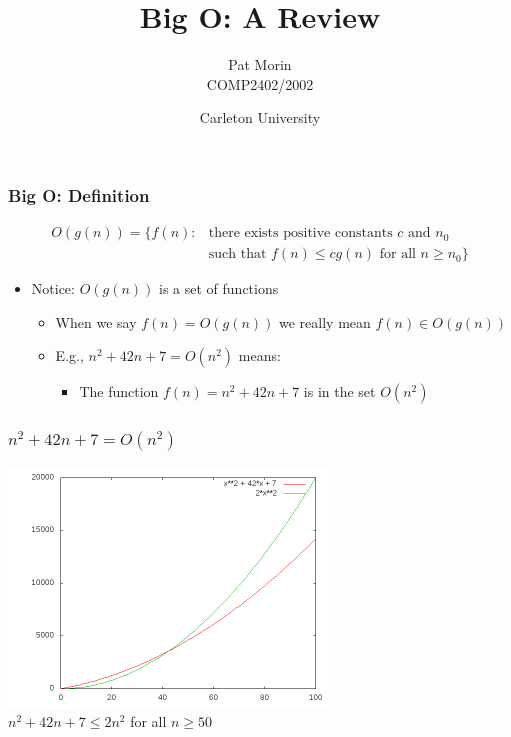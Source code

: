 \documentclass[xcolor=dvipsnames]{beamer}
\title{Big O: A Review}
\author{Pat Morin \\ COMP2402/2002}
\date{Carleton University}
\begin{document}
\begin{frame}
  \titlepage
\end{frame}

\begin{frame}
  \frametitle{Big O: Definition} 
   \[ \begin{array}{ll} O(g(n)) = \{ f(n) : &
          \mbox{there exists positive constants $c$ and $n_0$} \\
          & \mbox{such that $f(n) \le cg(n)$ for all $n\ge n_0$} \}\end{array} 
   \]
  \begin{itemize}
  \item<2-> Notice: $O(g(n))$ is a set of functions
   \begin{itemize}
     \item<3-> When we say $f(n)=O(g(n))$ we really mean $f(n)\in O(g(n))$
     \item<4-> E.g., $n^2 + 42n + 7 = O(n^2)$ means:
     \begin{itemize}
       \item<4-> The function $f(n)=n^2 + 42n + 7$ is in the set $O(n^2)$
     \end{itemize}
   \end{itemize}
  \end{itemize}

\end{frame}

\begin{frame}
  \frametitle{$n^2 + 42n + 7 = O(n^2)$}
  \begin{center}
    \includegraphics[height=2.5in]{images/graph} \\
    $n^2 + 42n + 7 \le 2 n^2$ for all $n\ge 50$
  \end{center}
\end{frame}
\end{document}
